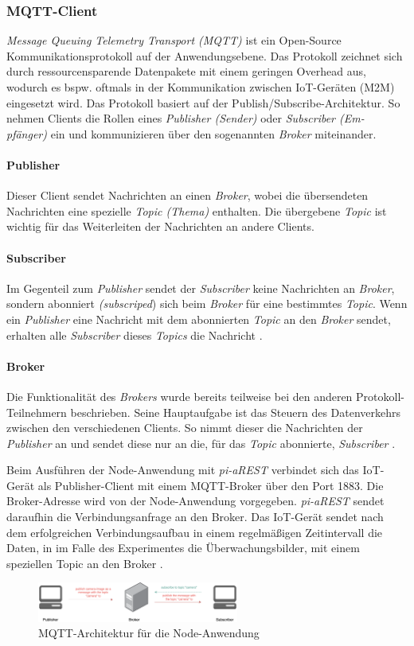 \subsubsection{MQTT-Client}
\textit{Message Queuing Telemetry Transport (MQTT)} ist ein Open-Source
Kommunikationsprotokoll auf der Anwendungsebene. Das Protokoll zeichnet sich
durch ressourcensparende Datenpakete mit einem geringen Overhead aus, wodurch
es bspw. oftmals in der Kommunikation zwischen IoT-Geräten (M2M) eingesetzt
wird. Das Protokoll basiert auf der Publish/Subscribe-Architektur. So nehmen
Clients die Rollen eines \textit{Publisher (Sender)} oder \textit{Subscriber
(Em- pfänger)} ein und kommunizieren über den sogenannten \textit{Broker}
miteinander. \cite{mqtt, wong20man}

\paragraph{Publisher} 
Dieser Client sendet Nachrichten an einen \textit{Broker}, wobei die
übersendeten Nachrichten eine spezielle \textit{Topic (Thema)} enthalten.
Die übergebene \textit{Topic} ist wichtig für das Weiterleiten der Nachrichten
an andere Clients. \cite{mqtt, wong20man}

\paragraph{Subscriber} 
Im Gegenteil zum \textit{Publisher} sendet der \textit{Subscriber} keine
Nachrichten an \textit{Broker}, sondern abonniert \textit{(subscriped}) sich
beim \textit{Broker} für eine bestimmtes \textit{Topic}.  Wenn ein
\textit{Publisher} eine Nachricht mit dem abonnierten \textit{Topic} an den
\textit{Broker} sendet, erhalten alle \textit{Subscriber} dieses
\textit{Topics} die Nachricht \cite{mqtt, wong20man}.

\paragraph{Broker} 
Die Funktionalität des \textit{Brokers} wurde bereits teilweise bei den anderen
Protokoll-Teilnehmern beschrieben. Seine Hauptaufgabe ist das Steuern des
Datenverkehrs zwischen den verschiedenen Clients.  So nimmt dieser die
Nachrichten der \textit{Publisher} an und sendet diese nur an die, für das
\textit{Topic} abonnierte, \textit{Subscriber} \cite{mqtt, wong20man}.

Beim Ausführen der Node-Anwendung mit \textit{pi-aREST} verbindet sich das
IoT-Gerät als Publisher-Client mit einem MQTT-Broker über den Port 1883. Die
Broker-Adresse wird von der Node-Anwendung vorgegeben.  \textit{pi-aREST}
sendet daraufhin die Verbindungsanfrage an den Broker. Das IoT-Gerät sendet
nach dem erfolgreichen Verbindungsaufbau in einem regelmäßigen Zeitintervall
die Daten, in im Falle des Experimentes die Überwachungsbilder, mit einem
speziellen Topic an den Broker \cite{piarestgtihub}.

\begin{figure}[htbp]
  \centering
  \includegraphics[width=250px]{images/mqtt.png}
  \caption{MQTT-Architektur für die Node-Anwendung \cite{mqtt}}
  \label{fig:arch-mqtt}
\end{figure}

